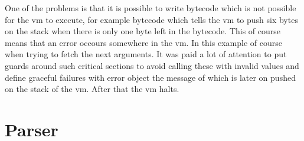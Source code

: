 One of the problems is that it is possible to write bytecode which is not possible for the vm to execute, for example bytecode which tells the vm to push six bytes on the stack when there is only one byte left in the bytecode. This of course means that an error occours somewhere in the vm. In this example of course when trying to fetch the next arguments. It was paid a lot of attention to put guards around such critical sections to avoid calling these with invalid values and define graceful failures with error object  the message of which is later on pushed on the stack of the vm. After that the vm halts. 


\section{Parser}
